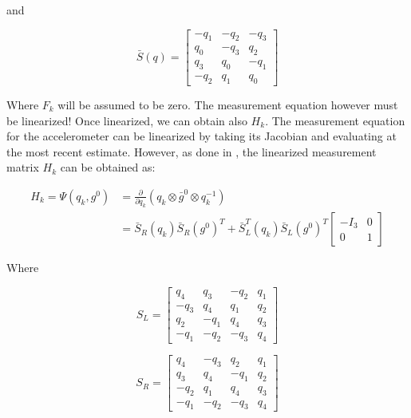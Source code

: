 \documentclass[a4paper,10pt]{article}
\begin{document}
\begin{itemize}
and 

\begin{equation}
 \bar{S}(q) = \left[
 \begin{matrix}
  -q_1 & -q_2 & -q_3 \\
   q_0 & -q_3 &  q_2 \\
   q_3 &  q_0 & -q_1 \\
  -q_2 &  q_1 &  q_0
 \end{matrix}\right]
\end{equation}

Where $F_k$ will be assumed to be zero. The measurement equation however must be linearized! Once linearized, we can obtain also $H_k$. The measurement equation for the accelerometer can be linearized by taking its Jacobian and evaluating at the most recent estimate. However, as done in \cite{Ligorio2013}, the linearized measurement matrix $H_k$ can be obtained as:

\begin{align}
 H_k = \Psi(q_k, g^0) &= \frac{\partial}{\partial q_k}  \left( q_k \otimes \bar{g}^0 \otimes q^{-1}_k \right)\\
                      &= \bar{S}_R(q_k) \bar{S}_R(g^0)^T + \bar{S}^T_L(q_k) \bar{S}_L(g^0)^T \left[\begin{matrix} -I_3 & 0 \\0  & 1 
			     \end{matrix}\right]
\end{align}

Where

\begin{equation}
 S_L = \left[\begin{matrix}
	       q_4 &  q_3 & -q_2 & q_1\\
	      -q_3 &  q_4 &  q_1 & q_2\\
	       q_2 & -q_1 &  q_4 & q_3\\
	      -q_1 & -q_2 & -q_3 & q_4
	     \end{matrix}\right]
\end{equation}

\begin{equation}
  S_R = \left[\begin{matrix}
	       q_4 & -q_3 &  q_2 & q_1\\
	       q_3 &  q_4 & -q_1 & q_2\\
	      -q_2 &  q_1 &  q_4 & q_3\\
	      -q_1 & -q_2 & -q_3 & q_4
	     \end{matrix}\right]
\end{equation}


\end{itemize}
\end{document}
